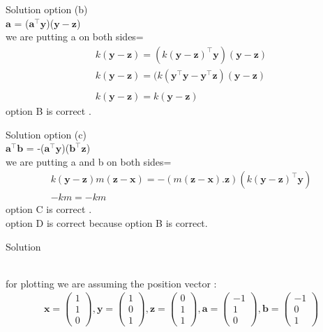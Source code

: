 \documentclass{beamer}
\let\vec\mathbf
\theoremstyle{remark}
\newcommand{\myvec}[1]{\ensuremath{\begin{pmatrix}#1\end{pmatrix}}}
\numberwithin{equation}{section}
\begin{document}
\begin{frame}{Solution}
 option (b)
\\
$\vec{a}$ = ($\vec{a}^\top\vec{y}$)($\vec{y}-\vec{z}$)
\\
we are putting a on both sides=
\\
 \begin{align*}
   k(\vec{y}-\vec{z})=(k(\vec{y}-\vec{z})^\top\vec{y})(\vec{y}-\vec{z})
    \\
    k(\vec{y}-\vec{z})=(k(\vec{y}^\top\vec{y}-\vec{y}^\top\vec{z})(\vec{y}-\vec{z})
    \\
    \\
     k(\vec{y}-\vec{z})= k(\vec{y}-\vec{z})
 \end{align*}
 option B is correct .
\end{frame}
\begin{frame}{Solution}
 option (c)
\\
$\vec{a}^\top\vec{b}$ = -($\vec{a}^\top\vec{y}$)($\vec{b}^\top\vec{z}$)
\\
we are putting a and b on both sides=
\\
\begin{align*}
    k(\vec{y}-\vec{z})m(\vec{z}-\vec{x})=-( m(\vec{z}-\vec{x}).\vec{z})(k(\vec{y}-\vec{z})^\top\vec{y})
    \\
    -km=-km
\end{align*}
option C is correct  .
\\
option D is correct because option B is correct.
\end{frame}
\begin{frame}{Solution}

\\
for plotting we are assuming the position vector :
\begin{align*}
    \vec x=\myvec{1\\1\\0},\vec y=\myvec{1\\0\\1},\vec z=\myvec{0\\1\\1},\vec a=\myvec{-1\\1\\0},\vec b=\myvec{-1\\0\\1}
\end{align*}
\end{frame}
\end{document}
